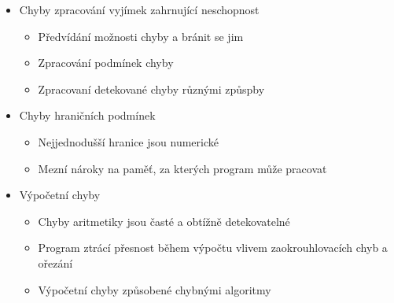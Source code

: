 \begin{itemize}[itemsep=0px]
\item Chyby zpracování vyjímek zahrnující neschopnost
    \begin{itemize}[itemsep=0px]
    \item Předvídání možnosti chyby a bránit se jim
    \item Zpracování podmínek chyby
    \item Zpracovaní detekované chyby různými způspby
    \end{itemize}
\item Chyby hraničních podmínek
    \begin{itemize}[itemsep=0px]
    \item Nejjednodušší hranice jsou numerické
    \item Mezní nároky na paměť, za kterých program může pracovat
    \end{itemize}
\item Výpočetní chyby
    \begin{itemize}[itemsep=0px]
    \item Chyby aritmetiky jsou časté a obtížně detekovatelné
    \item Program ztrácí přesnost během výpočtu vlivem zaokrouhlovacích chyb a ořezání
    \item Výpočetní chyby způsobené chybnými algoritmy
    \end{itemize}
\end{itemize}

